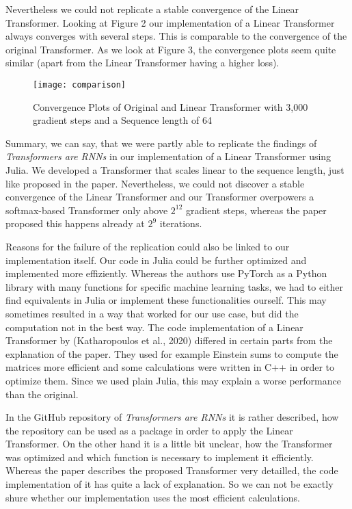 \documentclass[DIV=13,fontsize=11pt]{scrartcl}
\begin{document}
Nevertheless we could not replicate a stable convergence of the Linear Transformer. Looking at Figure 2 our implementation of a Linear Transformer always converges with several steps. This is comparable to the convergence of the original Transformer. As we look at Figure 3, the convergence plots seem quite similar (apart from the Linear Transformer having a higher loss).

\begin{figure}[h]
    \centering
    \texttt{[image: comparison]}
    \caption{Convergence Plots of Original and Linear Transformer with 3,000 gradient steps and a Sequence length of 64}
    \label{fig:mesh1}
\end{figure}

Summary, we can say, that we were partly able to replicate the findings of  \textit{Transformers are RNNs} in our implementation of a Linear Transformer using Julia. We developed a Transformer that scales linear to the sequence length, just like proposed in the paper. Nevertheless, we could not discover a stable convergence of the Linear Transformer and our Transformer overpowers a softmax-based Transformer only above \(2^{12}\) gradient steps, whereas the paper proposed this happens already at \(2^{9}\) iterations. 

Reasons for the failure of the replication could also be linked to our implementation itself. Our code in Julia could be further optimized and implemented more effiziently. Whereas the authors use PyTorch as a Python library with many functions for specific machine learning tasks, we had to either find equivalents in Julia or implement these functionalities ourself. This may sometimes resulted in a way that worked for our use case, but did the computation not in the best way. The code implementation of a Linear Transformer by (Katharopoulos et al., 2020) differed in certain parts from the explanation of the paper. They used for example Einstein sums to compute the matrices more efficient and some calculations were written in C++ in order to optimize them. Since we used plain Julia, this may explain a worse performance than the original. 

In the GitHub repository of \textit{Transformers are RNNs} it is rather described, how the repository can be used as a package in order to apply the Linear Transformer. On the other hand it is a little bit unclear, how the Transformer was optimized and which function is necessary to implement it efficiently. Whereas the paper describes the proposed Transformer very detailled, the code implementation of it has quite a lack of explanation.  So we can not be exactly shure whether our implementation uses the most efficient calculations.
\end{document}
